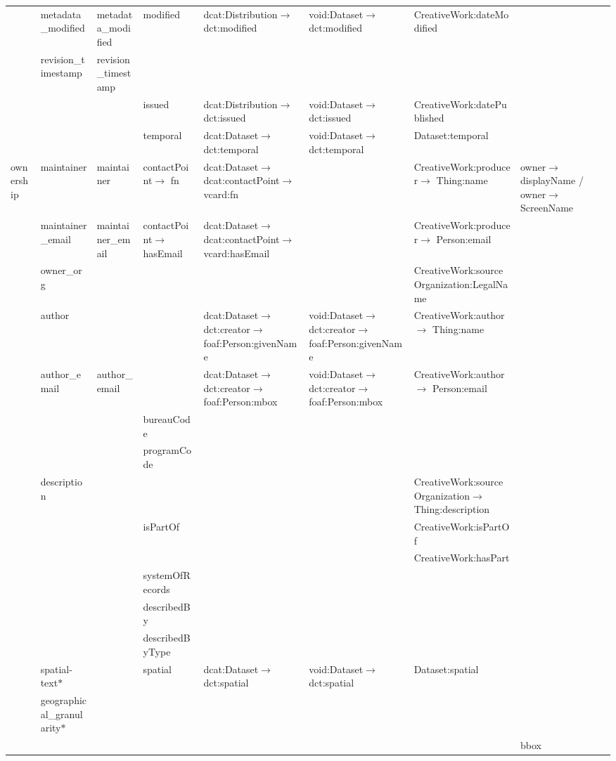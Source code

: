 \documentclass[runningheads,a4paper]{../../Tools/LaTEX/llncs}
\begin{document}
{\begin{landscape}
{\begin{longtable}{|p{1cm}|m{3.1cm}|m{2.4cm}|m{2.5cm}|p{3.8cm}|m{3.8cm}|m{6.5cm}|m{2.5cm}|}
\cline{2-8}
 & metadata\_modified & metadata\_modified & modified & dcat:Distribution$\rightarrow$ dct:modified & void:Dataset$\rightarrow$ dct:modified & CreativeWork:dateModified & \tabularnewline
\cline{2-8}
 & revision\_timestamp & revision\_timestamp &  &  &  &  & \tabularnewline
\cline{2-8}
 &  &  & issued & dcat:Distribution$\rightarrow$ dct:issued & void:Dataset$\rightarrow$ dct:issued & CreativeWork:datePublished & \tabularnewline
\cline{2-8}
 &  &  & temporal & dcat:Dataset$\rightarrow$ dct:temporal & void:Dataset$\rightarrow$ dct:temporal & Dataset:temporal & \tabularnewline
\hline
\multirow{14}{2cm}{ownership} & maintainer & maintainer & contactPoint$\rightarrow$ fn & dcat:Dataset$\rightarrow$ dcat:contactPoint$\rightarrow$ vcard:fn &  & CreativeWork:producer$\rightarrow$ Thing:name & owner$\rightarrow$ displayName / owner$\rightarrow$ ScreenName\tabularnewline
\cline{2-8}
 & maintainer\_email & maintainer\_email & contactPoint$\rightarrow$ hasEmail & dcat:Dataset$\rightarrow$ dcat:contactPoint$\rightarrow$ vcard:hasEmail &  & CreativeWork:producer$\rightarrow$ Person:email & \tabularnewline
\cline{2-8}
 & owner\_org &  &  &  &  & CreativeWork:sourceOrganization:LegalName & \tabularnewline
\cline{2-8}
 & author &  &  & dcat:Dataset$\rightarrow$ dct:creator$\rightarrow$ foaf:Person:givenName & void:Dataset$\rightarrow$ dct:creator$\rightarrow$ foaf:Person:givenName & CreativeWork:author$\rightarrow$ Thing:name & \tabularnewline
\cline{2-8}
 & author\_email & author\_email &  & dcat:Dataset$\rightarrow$ dct:creator$\rightarrow$ foaf:Person:mbox & void:Dataset$\rightarrow$ dct:creator$\rightarrow$ foaf:Person:mbox & CreativeWork:author$\rightarrow$ Person:email & \tabularnewline
\cline{2-8}
 &  &  & bureauCode &  &  &  & \tabularnewline
\cline{2-8}
 &  &  & programCode &  &  &  & \tabularnewline
\cline{2-8}
 & description &  &  &  &  & CreativeWork:sourceOrganization$\rightarrow$ Thing:description & \tabularnewline
\cline{2-8}
 &  &  & isPartOf &  &  & CreativeWork:isPartOf & \tabularnewline
\cline{2-8}
 &  &  &  &  &  & CreativeWork:hasPart & \tabularnewline
\cline{2-8}
 &  &  & systemOfRecords &  &  &  & \tabularnewline
\cline{2-8}
 &  &  & describedBy &  &  &  & \tabularnewline
\cline{2-8}
 &  &  & describedByType &  &  &  & \tabularnewline
\hline
\multirow{6}{2cm}{GeoSpatial} & spatial-text$\ast$ &  & spatial & dcat:Dataset$\rightarrow$ dct:spatial & void:Dataset$\rightarrow$ dct:spatial & Dataset:spatial & \tabularnewline
\cline{2-8}
 & geographical\_granularity$\ast$ &  &  &  &  &  & \tabularnewline
\cline{2-8}
 &  &  &  &  &  &  & bbox\tabularnewline

\end{longtable}}
\end{landscape}}
\end{document}
